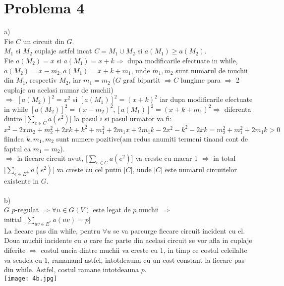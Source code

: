 \documentclass{article}
\begin{document}
\section*{Problema 4}
\Large
a)\\
Fie $C$ un circuit din $G$. \\
$M_1$ si $M_2$ cuplaje astfel incat $C=M_1 \cup M_2$ si $a(M_1)\geq a(M_2)$.\\
Fie $a(M_2)=x$ si $a(M_1)=x+k \Rightarrow$ dupa modificarile efectuate in while, $a(M_2)=x-m_2, a(M_1)=x+k+m_1$, unde $m_1, m_2$ sunt numarul de muchii din $M_1$, respectiv $M_2$, iar $m_1 = m_2$ ($G$ graf bipartit $\Rightarrow C$ lungime para $\Rightarrow$ 2 cuplaje au acelasi numar de muchii)\\
$\Rightarrow$   
$[a(M_2)]^2=x^2$ si $[a(M_1)]^2=(x+k)^2$ iar dupa modificarile efectuate in while $[a(M_2)]^2=(x-m_2)^2, [a(M_1)]^2=(x+k+m_1)^2 \Rightarrow$ diferenta dintre $\Big [\sum_{e\in C} a(e^2) \Big]$ la pasul $i$ si pasul urmator va fi: $x^2 - 2xm_2 + m_2^2+ 2xk + k^2 + m_1^2 + 2m_1x + 2m_1k - 2x^2 - k^2 -2xk = m_2^2 + m_1^2 + 2m_1k > 0$ fiindca $k,m_1,m_2$ sunt numere pozitive(am redus anumiti termeni tinand cont de faptul ca $m_1=m_2$).\\
$\Rightarrow$ la fiecare circuit avut, $\Big [\sum_{e\in C} a(e^2) \Big]$ va creste cu macar 1 $\Rightarrow$ in total $\Big [\sum_{e\in E^+} a(e^2) \Big]$ va creste cu cel putin $|C|$, unde $|C|$ este numarul circuitelor existente in $G$.\\
\bigskip\\
b)\\
$G$ $p$-regulat $\Rightarrow \forall u \in G(V)$ este legat de $p$ muchii $\Rightarrow$ \\
initial $\Big [\sum_{uv\in E^*} a(uv) = p\Big]$\\
La fiecare pas din while, pentru $\forall u$ se va parcurge fiecare circuit incident cu el. Doua muchii incidente cu $u$ care fac parte din acelasi circuit se vor afla in cuplaje diferite $\Rightarrow$ costul uneia dintre muchii va creste cu 1, in timp ce costul celeilalte va scadea cu 1, ramanand astfel, intotdeauna cu un cost constant la fiecare pas din while. Astfel, costul ramane intotdeauna $p$.\\
 \texttt{[image: 4b.jpg]}
\end{document}
